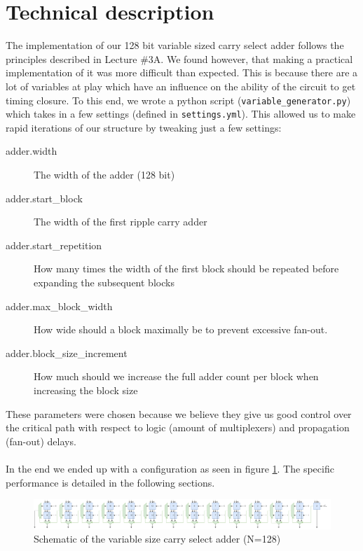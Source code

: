 \documentclass[a4paper,kul]{kulakarticle} %
\begin{document}
\newpage
\section{Technical description}
\label{sec:tech_desc}


The implementation of our 128 bit variable sized carry select adder follows the principles described in Lecture \#3A. We found however, that making a practical implementation of it was more difficult than expected. This is because there are a lot of variables at play which have an influence on the ability of the circuit to get timing closure. To this end, we wrote a python script (\texttt{variable\_generator.py}) which takes in a few settings (defined in \texttt{settings.yml}). This allowed us to make rapid iterations of our structure by tweaking just a few settings:
\begin{description}
	\item[adder.width] The width of the adder (128 bit)
	\item[adder.start\_block] The width of the first ripple carry adder 
	\item[adder.start\_repetition] How many times the width of the first block should be repeated before expanding the subsequent blocks
	\item[adder.max\_block\_width] How wide should a block maximally be to prevent excessive fan-out. 
	\item[adder.block\_size\_increment] How much should we increase the full adder count per block when increasing the block size
\end{description}
These parameters were chosen because we believe they give us good control over the critical path with respect to logic (amount of multiplexers) and propagation (fan-out) delays. \\
\\
In the end we ended up with a configuration as seen in figure \ref{fig:128bit-adder}. The specific performance is detailed in the following sections. 
\begin{figure}[h]
	\centering
	\includegraphics[width=1\linewidth]{images/128bit-ADDER}
	\caption{Schematic of the variable size carry select adder (N=128)}
	\label{fig:128bit-adder}
\end{figure}
\end{document}
